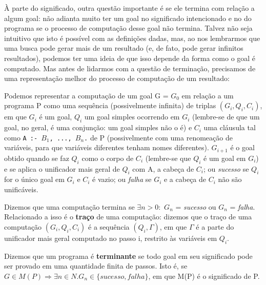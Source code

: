 \documentclass{article}
\theoremstyle{definition}
\theoremstyle{remark}
\begin{document}
À parte do significado, outra questão importante é se ele termina com relação a algum goal: não adianta muito ter um goal no significado intencionado e no do programa se o processo de computação desse goal não termina. Talvez não seja intuitivo que isto é possível com as definições dadas, mas, ao nos lembrarmos que uma busca pode gerar mais de um resultado (e, de fato, pode gerar infinitos resultados), podemos ter uma ideia de que isso depende da forma como o goal é
computado. Mas antes de lidarmos com a questão de terminação, precisamos de uma representação melhor do processo de computação de um resultado:

Podemos representar a computação de um goal G = $G_0$ em relação a um programa P como uma sequência (possivelmente infinita) de triplas \textit{$(G_i, Q_i, C_i)$}, em que $G_i$ é um
goal, $Q_i$ um goal simples ocorrendo em $G_i$ (lembre-se de que um goal, no geral, é uma conjunção: um goal simples não o é) e $C_i$ uma cláusula tal como  {\tt A :- $B_1$, ..., $B_n$.} de P (possivelmente com uma renomeação de variáveis, para que variáveis diferentes tenham nomes diferentes). $G_{i+1}$ é o goal obtido quando se faz $Q_i$ como o corpo de $C_i$ (lembre-se que $Q_i$ é um goal em $G_i$) e se aplica o unificador mais geral de $Q_i$ com A, a cabeça de $C_i$; ou \textit{sucesso} se $Q_i$ for o único goal em $G_i$ e $C_i$ é vazio; ou \textit{falha} se $G_i$ e a cabeça de $C_i$ não são unificáveis.

Dizemos que uma computação termina se $\exists n > 0:$ $G_n$ = \textit{sucesso} ou $G_n$ = \textit{falha}. Relacionado a isso é o \textbf{traço} de uma computação: dizemos que o traço de uma computação $(G_i, Q_i, C_i)$ é a sequência $(Q_i, \Gamma)$, em que $\Gamma$ é a parte do unificador mais geral computado no passo i, restrito às variáveis em $Q_i$.

Dizemos que um programa é \textbf{terminante} se todo goal em seu significado pode ser provado em uma quantidade finita de passos. Isto é, se $G \in M(P) \Rightarrow \exists n \in N. G_n \in \{sucesso, falha\}$, em que M(P) é o significado de P.
\end{document}

